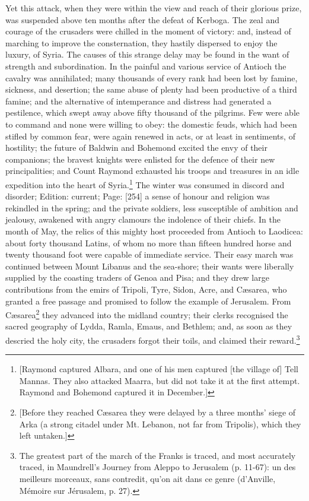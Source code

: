 Yet this attack, when they were within the view and reach of their glorious prize, was suspended above ten months after the defeat of Kerboga. The zeal and courage of the crusaders were chilled in the moment of victory: and, instead of marching to improve the consternation, they hastily dispersed to enjoy the luxury, of Syria. The causes of this strange delay may be found in the want of strength and subordination. In the painful and various service of Antioch the cavalry was annihilated; many thousands of every rank had been lost by famine, sickness, and desertion; the same abuse of plenty had been productive of a third famine; and the alternative of intemperance and distress had generated a pestilence, which swept away above fifty thousand of the pilgrims. Few were able to command and none were willing to obey: the domestic feuds, which had been stifled by common fear, were again renewed in acts, or at least in sentiments, of hostility; the future of Baldwin and Bohemond excited the envy of their companions; the bravest knights were enlisted for the defence of their new principalities; and Count Raymond exhausted his troops and treasures in an idle expedition into the heart of Syria.\footnote{[Raymond captured Albara, and one of his men captured [the village of] Tell Mannas. They also attacked Maarra, but did not take it at the first attempt. Raymond and Bohemond captured it in December.]} The winter was consumed in discord and disorder; Edition: current; Page: [254] a sense of honour and religion was rekindled in the spring; and the private soldiers, less susceptible of ambition and jealousy, awakened with angry clamours the indolence of their chiefs. In the month of May, the relics of this mighty host proceeded from Antioch to Laodicea: about forty thousand Latins, of whom no more than fifteen hundred horse and twenty thousand foot were capable of immediate service. Their easy march was continued between Mount Libanus and the sea-shore; their wants were liberally supplied by the coasting traders of Genoa and Pisa; and they drew large contributions from the emirs of Tripoli, Tyre, Sidon, Acre, and Cæsarea, who granted a free passage and promised to follow the example of Jerusalem. From Cæsarea\footnote{[Before they reached Cæsarea they were delayed by a three months\texthebrew{}’ siege of Arka (a strong citadel under Mt. Lebanon, not far from Tripolis), which they left untaken.]} they advanced into the midland country; their clerks recognised the sacred geography of Lydda, Ramla, Emaus, and Bethlem; and, as soon as they descried the holy city, the crusaders forgot their toils, and claimed their reward.\footnote{The greatest part of the march of the Franks is traced, and most accurately traced, in Maundrell\texthebrew{}’s Journey from Aleppo to Jerusalem (p. 11-67): un des meilleurs morceaux, sans contredit, qu\texthebrew{}’on ait dans ce genre (d\texthebrew{}’Anville, Mémoire sur Jérusalem, p. 27).}

